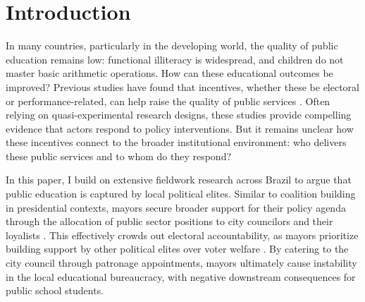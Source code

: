 \documentclass[12pt,a4paper]{article}
\begin{document}
\section{Introduction}


In many countries, particularly in the developing world, the quality of public education remains low: functional illiteracy is widespread, and children do not master basic arithmetic operations. How can these educational outcomes be improved? Previous studies have found that incentives, whether these be electoral or performance-related, can help raise the quality of public services \citep{gulzar_politicians_2017,duflo_incentives_2012}. Often relying on quasi-experimental research designs, these studies provide compelling evidence that actors respond to policy interventions.\citep{finan_personnel_2015} But it remains unclear how these incentives connect to the broader institutional environment: who delivers these public services and to whom do they respond?

In this paper, I build on extensive fieldwork research across Brazil to argue that public education is captured by local political elites. Similar to coalition building in presidential contexts, mayors secure broader support for their policy agenda through the allocation of public sector positions to city councilors and their loyalists \citep{laver_coalitions_1990, power_optimism_2010}. This effectively crowds out electoral accountability, as mayors prioritize building support by other political elites over voter welfare \citep{ferejohn_incumbent_1986}. By catering to the city council through patronage appointments, mayors ultimately cause instability in the local educational bureaucracy, with negative downstream consequences for public school students.
\end{document}
